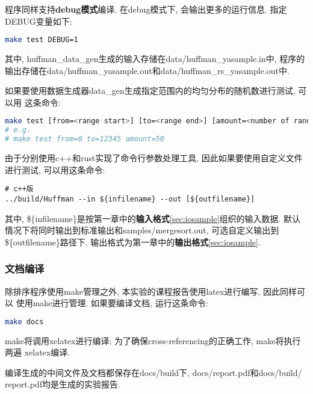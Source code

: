 程序同样支持\textbf{debug模式}编译. 在debug模式下, 会输出更多的运行信息.
指定DEBUG变量如下:
\begin{lstlisting}[language=bash]
make test DEBUG=1
\end{lstlisting}

其中, huffman\_data\_gen生成的输入存储在data/huffman\_yasample.in中,
程序的输出存储在data/huffman\_yasample.out和data/huffman\_rs\_yasample.out中. \par

如果要使用数据生成器data\_gen生成指定范围内的均匀分布的随机数进行测试, 可以用
这条命令:
\begin{lstlisting}[language=bash]
make test [from=<range start>] [to=<range end>] [amount=<number of random numbers>]
# e.g. 
# make test from=0 to=12345 amount=50
\end{lstlisting}

由于分别使用c++和rust实现了命令行参数处理工具, 因此如果要使用自定义文件进行测试,
可以用这条命令:
\begin{lstlisting}
# c++版
../build/Huffman --in ${infilename} --out [${outfilename}]
\end{lstlisting}
其中, \$\{infilename\}是按第一章中的\textbf{输入格式}\ref{sec:iosample}组织的输入数据.
默认情况下将同时输出到标准输出和samples/mergesort.out, 可选自定义输出到
\$\{outfilename\}路径下. 输出格式为第一章中的\textbf{输出格式}\ref{sec:iosample}.

\subsubsection{文档编译}
除排序程序使用make管理之外, 本实验的课程报告使用latex进行编写, 因此同样可以
使用make进行管理. 如果要编译文档, 运行这条命令:
\begin{lstlisting}[language=bash]
make docs
\end{lstlisting}
make将调用xelatex进行编译; 为了确保cross-referencing的正确工作, make将执行两遍
xelatex编译.\par
编译生成的中间文件及文档都保存在docs/build下, docs/report.pdf和docs/build/
report.pdf均是生成的实验报告.

